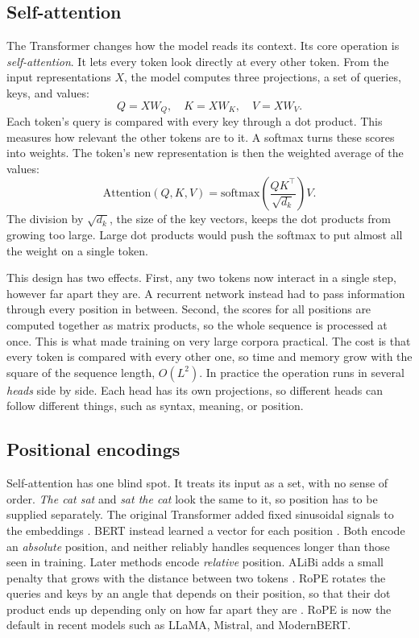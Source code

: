 \subsection{Self-attention}

The Transformer \citep{vaswani2017attention} changes how the model reads its context.
Its core operation is \emph{self-attention}.
It lets every token look directly at every other token. From the input representations
$X$, the model computes three projections, a set of queries, keys, and values:
\[
  Q = XW_Q, \quad K = XW_K, \quad V = XW_V.
\]
Each token's query is compared with every key through a dot product. This measures
how relevant the other tokens are to it. A softmax turns these scores into weights.
The token's new representation is then the weighted average of the values:
\[
  \mathrm{Attention}(Q,K,V) = \mathrm{softmax}\!\left(\frac{QK^\top}{\sqrt{d_k}}\right) V.
\]
The division by $\sqrt{d_k}$, the size of the key vectors, keeps the dot products
from growing too large. Large dot products would push the softmax to put almost all
the weight on a single token.

This design has two effects. First, any two tokens now interact in a single step,
however far apart they are. A recurrent network instead had to pass information through
every position in between. Second, the scores for all positions are computed together
as matrix products, so the whole sequence is processed at once. This is what made
training on very large corpora practical. The cost is that every token is compared
with every other one, so time and memory grow with the square of the sequence length,
$O(L^2)$. In practice the operation runs in several \emph{heads} side by side. Each
head has its own projections, so different heads can follow different things, such as
syntax, meaning, or position.

\subsection{Positional encodings}

Self-attention has one blind spot. It treats its input as a set, with no sense of
order. \emph{The cat sat} and \emph{sat the cat} look the same to it, so position
has to be supplied separately. The original Transformer added fixed sinusoidal
signals to the embeddings \citep{vaswani2017attention}. BERT instead learned a
vector for each position \citep{devlin_bert_2019}. Both encode an \emph{absolute}
position, and neither reliably handles sequences longer than those seen in training. Later
methods encode \emph{relative} position. ALiBi adds a small penalty that grows with
the distance between two tokens \citep{alibi}. RoPE rotates the queries and keys
by an angle that depends on their position, so that their dot product ends up
depending only on how far apart they are \citep{rope}. RoPE is now the default in recent
models such as LLaMA, Mistral, and ModernBERT.

